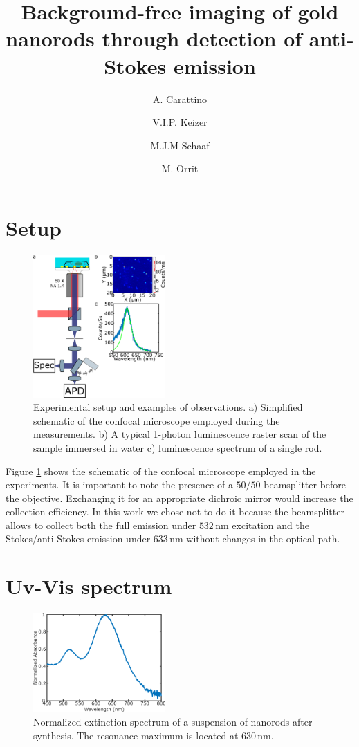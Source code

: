 \documentclass[journal=nalefd,manuscript=letter]{achemso}
\author{A. Carattino}
\author{V.I.P. Keizer}
\author{M.J.M Schaaf}
\author{M. Orrit}
\title{Background-free imaging of gold nanorods through detection of
anti-Stokes emission}
\newcommand{\nm}{\ensuremath{\,\textrm{nm}}}
\begin{document}
\maketitle

\section{Setup}

\begin{figure}[htp]
 \centering
 \includegraphics[width=0.45\textwidth]{Figures/Supplementary/01_Setup/setup_1.png}
 \caption{Experimental setup and examples of observations. a) Simplified
 schematic of the confocal microscope employed during the measurements. b) A
 typical 1-photon luminescence raster scan of the sample immersed in water c)
 luminescence spectrum of a single rod.}
 \label{fig:setup}
\end{figure}

Figure \ref{fig:setup} shows the schematic of the confocal microscope employed
in the experiments. It is important to note the presence of a $50/50$
beamsplitter before the objective. Exchanging it for an appropriate dichroic
mirror would increase the collection efficiency. In this work we chose not to do
it because the beamsplitter allows to collect both the full emission under
$532\nm$ excitation and the Stokes/anti-Stokes emission under $633\nm$ without
changes in the optical path. 

\section{Uv-Vis spectrum}

\begin{figure}[htp]
 \centering
 \includegraphics[width=0.45\textwidth]{Figures/Supplementary/02_UV-Vis/uvvis.png}
 \caption{Normalized extinction spectrum of a suspension of nanorods after
 synthesis. The resonance maximum is located at $630\nm$.}
 \label{fig:uvvis}
 \end{figure}
 
\end{document}
